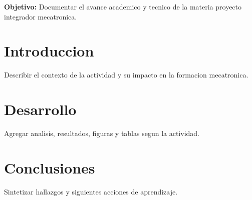 \documentclass[spanish,letterpaper,oneside]{article}
\begin{document}
\templatePortrait
\templatePagecfg
\onehalfspacing

\begin{abstractd}
\textbf{Objetivo:} Documentar el avance academico y tecnico de la materia proyecto integrador mecatronica.
\end{abstractd}

\templateIndex
\templateFinalcfg

\section{Introduccion}
Describir el contexto de la actividad y su impacto en la formacion mecatronica.

\section{Desarrollo}
Agregar analisis, resultados, figuras y tablas segun la actividad.

\section{Conclusiones}
Sintetizar hallazgos y siguientes acciones de aprendizaje.



\end{document}
